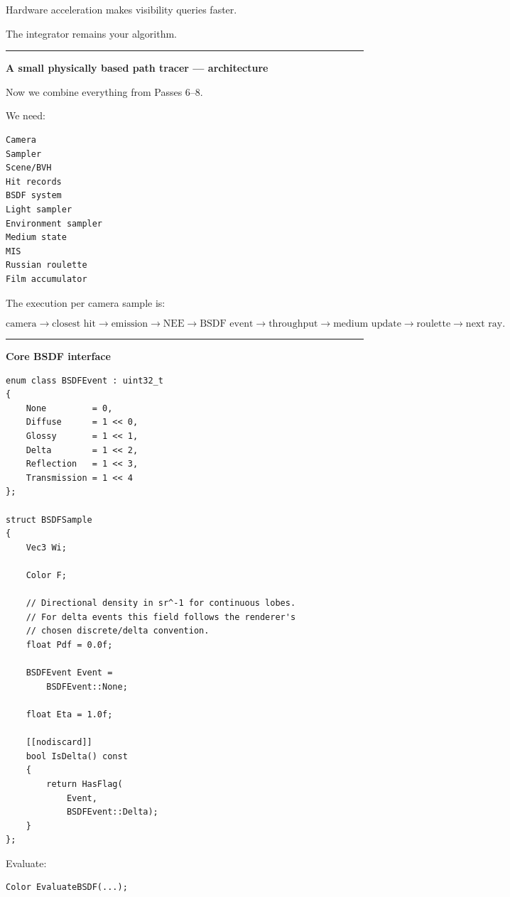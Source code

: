 Hardware acceleration makes visibility queries faster.

The integrator remains your algorithm.

\begin{center}\rule{0.5\linewidth}{0.5pt}\end{center}

\textbf{A small physically based path tracer --- architecture}

Now we combine everything from Passes 6--8.

We need:

\begin{verbatim}
Camera
Sampler
Scene/BVH
Hit records
BSDF system
Light sampler
Environment sampler
Medium state
MIS
Russian roulette
Film accumulator
\end{verbatim}

The execution per camera sample is:

\[
\text{camera}
\rightarrow
\text{closest hit}
\rightarrow
\text{emission}
\rightarrow
\text{NEE}
\rightarrow
\text{BSDF event}
\rightarrow
\text{throughput}
\rightarrow
\text{medium update}
\rightarrow
\text{roulette}
\rightarrow
\text{next ray}.
\]

\begin{center}\rule{0.5\linewidth}{0.5pt}\end{center}

\textbf{Core BSDF interface}

\begin{verbatim}
enum class BSDFEvent : uint32_t
{
    None         = 0,
    Diffuse      = 1 << 0,
    Glossy       = 1 << 1,
    Delta        = 1 << 2,
    Reflection   = 1 << 3,
    Transmission = 1 << 4
};

struct BSDFSample
{
    Vec3 Wi;

    Color F;

    // Directional density in sr^-1 for continuous lobes.
    // For delta events this field follows the renderer's
    // chosen discrete/delta convention.
    float Pdf = 0.0f;

    BSDFEvent Event =
        BSDFEvent::None;

    float Eta = 1.0f;

    [[nodiscard]]
    bool IsDelta() const
    {
        return HasFlag(
            Event,
            BSDFEvent::Delta);
    }
};
\end{verbatim}

Evaluate:

\begin{verbatim}
Color EvaluateBSDF(...);
\end{verbatim}

